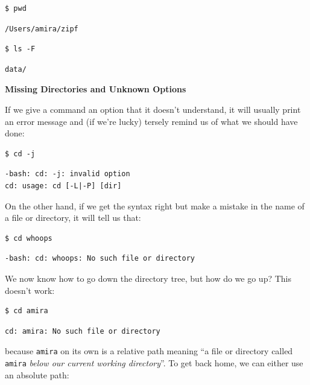 \documentclass[
]{krantz}
\renewenvironment{quote}{\begin{VF}}{\end{VF}}
\begin{document}
\begin{verbatim}
$ pwd
\end{verbatim}

\begin{verbatim}
/Users/amira/zipf
\end{verbatim}

\begin{verbatim}
$ ls -F
\end{verbatim}

\begin{verbatim}
data/
\end{verbatim}

\begin{quote}
\textbf{Missing Directories and Unknown Options}

If we give a command an option that it doesn't understand,
it will usually print an error message and (if we're lucky)
tersely remind us of what we should have done:

\begin{verbatim}
$ cd -j
\end{verbatim}

\begin{verbatim}
-bash: cd: -j: invalid option
cd: usage: cd [-L|-P] [dir]
\end{verbatim}

On the other hand,
if we get the syntax right but make a mistake in the name of a file or directory,
it will tell us that:

\begin{verbatim}
$ cd whoops
\end{verbatim}

\begin{verbatim}
-bash: cd: whoops: No such file or directory
\end{verbatim}
\end{quote}

We now know how to go down the directory tree,
but how do we go up?
This doesn't work:

\begin{verbatim}
$ cd amira
\end{verbatim}

\begin{verbatim}
cd: amira: No such file or directory
\end{verbatim}

because \texttt{amira} on its own is a relative path meaning
``a file or directory called \texttt{amira} \emph{below our current working directory}''.
To get back home,
we can either use an absolute path:
\end{document}
